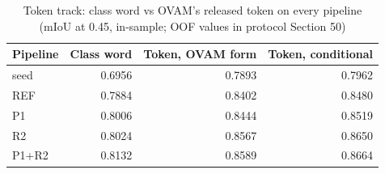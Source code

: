 \begin{table}[H]\centering\scriptsize\setlength{\tabcolsep}{3pt}
\begin{tabular}{>{\raggedright\arraybackslash}p{1.92cm}rrr}
\toprule
Pipeline & Class word & Token, OVAM form & Token, conditional \\
\midrule
seed & 0.6956 & 0.7893 & 0.7962 \\
REF & 0.7884 & 0.8402 & 0.8480 \\
P1 & 0.8006 & 0.8444 & 0.8519 \\
R2 & 0.8024 & 0.8567 & 0.8650 \\
P1+R2 & 0.8132 & 0.8589 & 0.8664 \\
\bottomrule
\end{tabular}
\caption{Token track: class word vs OVAM's released token on every pipeline (mIoU at 0.45, in-sample; OOF values in protocol Section 50)}\label{tab:a11_token_pipelines}
\end{table}
